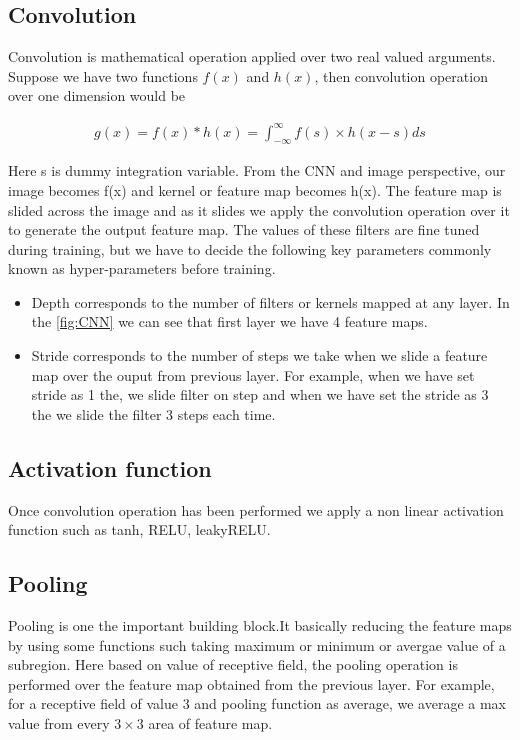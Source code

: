 \subsection{Convolution}

Convolution is mathematical operation applied over two real valued arguments. Suppose we have two functions $f(x)$ and $h(x)$, then convolution operation over one dimension would be 

 \begin{equation}\label{eq:convolution-1d}
        \begin{aligned}
            g(x)=f(x) \ast h(x) = \int_{-\infty }^{\infty} f(s) \times h(x-s) ds
        \end{aligned}
\end{equation}

Here s is dummy integration variable. 
From the CNN and image perspective, our image becomes f(x) and kernel or feature map becomes h(x). The feature map is slided across the image and as it slides we apply the convolution operation over it to generate the output feature map. The values of these filters are fine tuned during training, but we have to decide the following key parameters commonly known as hyper-parameters before training.
\begin{itemize}
    \item  Depth corresponds to the number of filters or kernels mapped at any layer. In the \cref{fig:CNN} we can see that first layer we have 4 feature maps.
    \item Stride corresponds to the number of steps we take when we slide a feature map over the ouput from previous layer. For example, when we have set stride as 1 the, we slide filter on step and when we have set the stride as 3 the we slide the filter 3 steps each time.
\end{itemize}

\subsection{ Activation function}
Once convolution operation has been performed we apply a non linear activation function such as tanh, RELU, leakyRELU.

\subsection{Pooling}
Pooling is one the important building block.It  basically reducing the feature maps by using some functions such taking maximum or minimum or avergae value of a subregion. Here based on value of receptive field, the pooling operation is performed over the feature map obtained from the previous layer. For example, for a receptive field of value 3 and pooling function as average, we average a max value from every $3 \times 3$ area of feature map.

